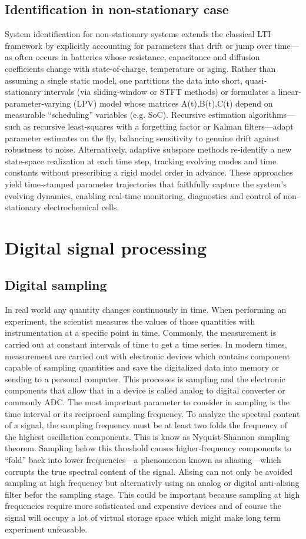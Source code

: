 \subsection{Identification in non-stationary case}
System identification for non‐stationary systems extends the classical LTI framework by explicitly accounting for parameters that drift or jump over time—as often occurs in batteries whose resistance, capacitance and diffusion coefficients change with state‐of‐charge, temperature or aging. Rather than assuming a single static model, one partitions the data into short, quasi‐stationary intervals (via sliding‐window or STFT methods) or formulates a linear‐parameter‐varying (LPV) model whose matrices A(t),B(t),C(t) depend on measurable “scheduling” variables (e.g. SoC). Recursive estimation algorithms—such as recursive least‐squares with a forgetting factor or Kalman filters—adapt parameter estimates on the fly, balancing sensitivity to genuine drift against robustness to noise. Alternatively, adaptive subspace methods re‐identify a new state‐space realization at each time step, tracking evolving modes and time constants without prescribing a rigid model order in advance. These approaches yield time‐stamped parameter trajectories that faithfully capture the system’s evolving dynamics, enabling real‐time monitoring, diagnostics and control of non‐stationary electrochemical cells.

\section{Digital signal processing}
\subsection{Digital sampling}
In real world any quantity changes continuously in time. When performing an experiment, the scientist measures the values of those quantities with instrumentation at a specific point in time. Commonly, the measurement is carried out at constant intervals of time to get a time series. In modern times, measurement are carried out with electronic devices which contains component capable of sampling quantities and save the digitalized data into memory or sending to a personal computer. This processes is sampling and the electronic components that allow that in a device is called analog to digital converter or commonly ADC. The most important parameter to consider in sampling is the time interval or its reciprocal sampling frequency. To analyze the spectral content of a signal, the sampling frequency must be at least two folds the frequency of the highest oscillation components. This is know as Nyquist-Shannon sampling theorem. Sampling below this threshold causes higher‐frequency components to “fold” back into lower frequencies—a phenomenon known as aliasing—which corrupts the true spectral content of the signal. Alising can not only be avoided sampling at high frequency but alternativly using an analog or digital anti-alising filter befor the sampling stage. This could be important  because sampling at high frequencies require more sofisticated and expensive devices and of course the signal will occupy a lot of virtual storage space which might make long term experiment unfeasable.

